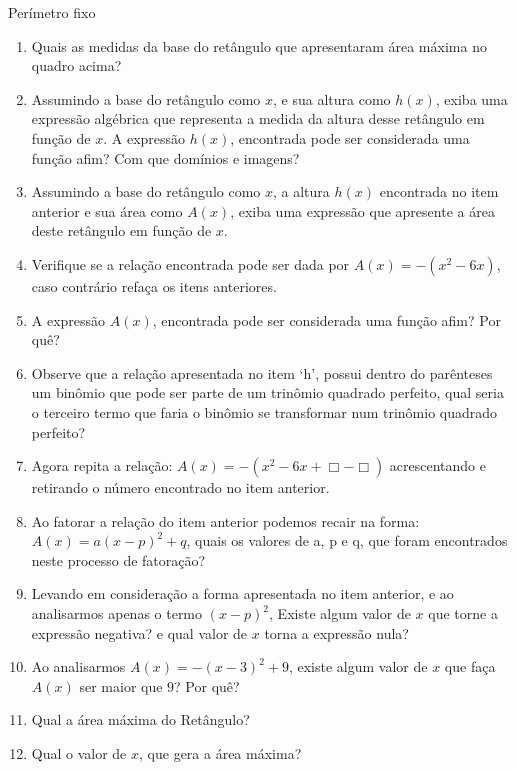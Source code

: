 \begin{task}{Perímetro fixo}
\begin{enumerate}
\item {} 
Quais as medidas da base do retângulo que apresentaram área máxima no quadro acima?

\item {} 
Assumindo a base do retângulo como \(x\), e sua altura como \(h(x)\), exiba uma expressão algébrica que representa a medida da altura desse retângulo em função de \(x\). A expressão \(h(x)\), encontrada pode ser considerada uma função afim? Com que domínios e imagens?

\item {} 
Assumindo a base do retângulo como \(x\), a altura \(h(x)\) encontrada no item anterior e sua área como \(A(x)\), exiba uma expressão que apresente a área deste retângulo em função de \(x\).

\item {} 
Verifique se a relação encontrada pode ser dada por \(A(x)=-(x^2-6x)\), caso contrário refaça os itens anteriores.

\item {} 
A expressão \(A(x)\), encontrada pode ser considerada uma função afim? Por quê?

\item {} 
Observe que a relação apresentada no item ‘h’, possui dentro do parênteses um binômio que pode ser parte de um trinômio quadrado perfeito, qual seria o terceiro termo que faria o binômio se transformar num trinômio quadrado perfeito?

\item {} 
Agora repita a relação: \(A(x)=-(x^2-6x+\Box -\Box)\) acrescentando e retirando o número encontrado no item anterior.

\item {} 
Ao fatorar a relação do item anterior podemos recair na forma: \(A(x)=a(x-p)^2+q\), quais os valores de a, p e q, que foram encontrados neste processo de fatoração?

\item {} 
Levando em consideração a forma apresentada no item anterior, e ao analisarmos apenas o termo \((x-p)^2\), Existe algum valor de \(x\) que torne a expressão negativa? e qual valor de \(x\) torna a expressão nula?

\item {} 
Ao analisarmos \(A(x)=-(x-3)^2+9\), existe algum valor de \(x\) que faça \(A(x)\) ser maior que \(9\)? Por quê?

\item {} 
Qual a área máxima do Retângulo?

\item {} 
Qual o valor de \(x\), que gera a área máxima?

\end{enumerate}
\end{task}

